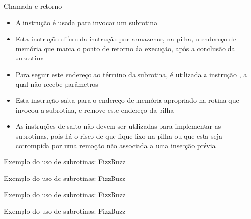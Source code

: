 \begin{frame}[fragile]{Chamada e retorno}

    \begin{itemize}
        \item A instrução  é usada para invocar um subrotina 


        \item Esta instrução difere da instrução  por armazenar, na pilha,
            o endereço de memória que marca o ponto de retorno da execução, após a conclusão
            da subrotina

        \item Para seguir este endereço ao término da subrotina, é utilizada a instrução
            , a qual não recebe parâmetros

        \item Esta instrução salta para o endereço de memória apropriado na rotina que invocou
            a subrotina, e remove este endereço da pilha

        \item As instruções de salto não devem ser utilizadas para implementar as subrotinas,
            pois há o risco de que fique lixo na pilha ou que esta seja corrompida por uma
            remoção não associada a uma inserção prévia
    \end{itemize}

\end{frame}

\begin{frame}[fragile]{Exemplo do uso de subrotinas: FizzBuzz}
\end{frame}

\begin{frame}[fragile]{Exemplo do uso de subrotinas: FizzBuzz}
\end{frame}

\begin{frame}[fragile]{Exemplo do uso de subrotinas: FizzBuzz}
\end{frame}

\begin{frame}[fragile]{Exemplo do uso de subrotinas: FizzBuzz}
\end{frame}


